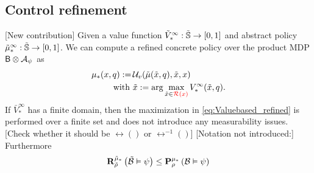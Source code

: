 \documentclass{ifacconf}
\newcommand{\red}[1]{{\color{red} #1}}
\begin{document}
%
%
%
%
%
%  
%
%
%

\subsection{Control refinement}
\red{[New contribution]}
Given a value function 
	$\tilde V^\infty_\ast:\tilde\S \rightarrow [0,1]$ and abstract policy 	$\tilde  \pol^\infty_\ast:\tilde\S \rightarrow [0,1]$. We can compute a refined  concrete policy over the product MDP $\MB\otimes\FSA_\psi$ as
	\begin{align}\label{eq:Valuebased_refined}
		\pol_\ast(x,q):=\, &\InF( \tilde{\pol}(\tilde x, q), \tilde x, x) \\ \mbox{ with } &\tilde x:=\arg\max_{ \tilde x\in\red
		{\rel(x)}} \bar V^\infty_\ast(\tilde x,q).
	\end{align}
If  $\bar V^\infty_\ast$ has a finite domain, then  the maximization in \eqref{eq:Valuebased_refined} is performed over a finite set and does not introduce any measurability issues. 
	\red{[Check whether it should be $\rel()$ or $\rel^{-1}()$] }
	\red{[Notation not introduced:]}
	Furthermore
\begin{align}
  \mathbf R^{\tilde \pol_\ast}_{\tilde\rho}\left(
\tilde{\mathcal{B}}
 \vDash \psi \right)\leq   \mathbf P^{ \pol_\ast} _{ \rho}\left(
 {\mathcal{B}}
 \vDash \psi \right)
\end{align}
	
\end{document}
